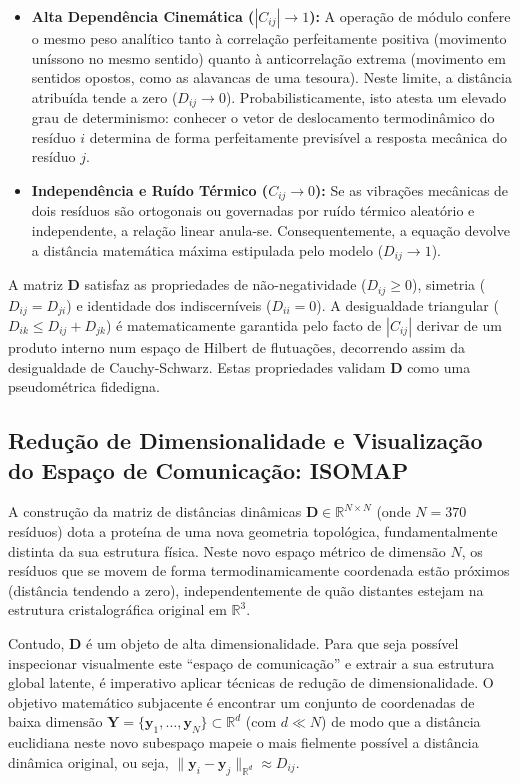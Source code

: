 \documentclass[12pt, a4paper]{article}
\begin{document}
\begin{itemize}
    \item \textbf{Alta Dependência Cinemática ($|C_{ij}| \to 1$):} A operação de módulo confere o mesmo peso analítico tanto à correlação perfeitamente positiva (movimento uníssono no mesmo sentido) quanto à anticorrelação extrema (movimento em sentidos opostos, como as alavancas de uma tesoura). Neste limite, a distância atribuída tende a zero ($D_{ij} \to 0$). Probabilisticamente, isto atesta um elevado grau de determinismo: conhecer o vetor de deslocamento termodinâmico do resíduo $i$ determina de forma perfeitamente previsível a resposta mecânica do resíduo $j$.
    \item \textbf{Independência e Ruído Térmico ($C_{ij} \to 0$):} Se as vibrações mecânicas de dois resíduos são ortogonais ou governadas por ruído térmico aleatório e independente, a relação linear anula-se. Consequentemente, a equação devolve a distância matemática máxima estipulada pelo modelo ($D_{ij} \to 1$).
\end{itemize}

A matriz $\mathbf{D}$ satisfaz as propriedades de não-negatividade ($D_{ij} \geq 0$), simetria ($D_{ij} = D_{ji}$) e identidade dos indiscerníveis ($D_{ii} = 0$). A desigualdade triangular ($D_{ik} \leq D_{ij} + D_{jk}$) é matematicamente garantida pelo facto de $|C_{ij}|$ derivar de um produto interno num espaço de Hilbert de flutuações, decorrendo assim da desigualdade de Cauchy-Schwarz. Estas propriedades validam $\mathbf{D}$ como uma pseudométrica fidedigna.

\subsection{Redução de Dimensionalidade e Visualização do Espaço de Comunicação: ISOMAP}
\label{sec:isomap_scree}

A construção da matriz de distâncias dinâmicas $\mathbf{D} \in \mathbb{R}^{N \times N}$ (onde $N=370$ resíduos) dota a proteína de uma nova geometria topológica, fundamentalmente distinta da sua estrutura física. Neste novo espaço métrico de dimensão $N$, os resíduos que se movem de forma termodinamicamente coordenada estão próximos (distância tendendo a zero), independentemente de quão distantes estejam na estrutura cristalográfica original em $\mathbb{R}^3$. 

Contudo, $\mathbf{D}$ é um objeto de alta dimensionalidade. Para que seja possível inspecionar visualmente este \enquote{espaço de comunicação} e extrair a sua estrutura global latente, é imperativo aplicar técnicas de redução de dimensionalidade. O objetivo matemático subjacente é encontrar um conjunto de coordenadas de baixa dimensão $\mathbf{Y} = \{\mathbf{y}_1, \ldots, \mathbf{y}_N\} \subset \mathbb{R}^d$ (com $d \ll N$) de modo que a distância euclidiana neste novo subespaço mapeie o mais fielmente possível a distância dinâmica original, ou seja, $\|\mathbf{y}_i - \mathbf{y}_j\|_{\mathbb{R}^d} \approx D_{ij}$.
\end{document}
